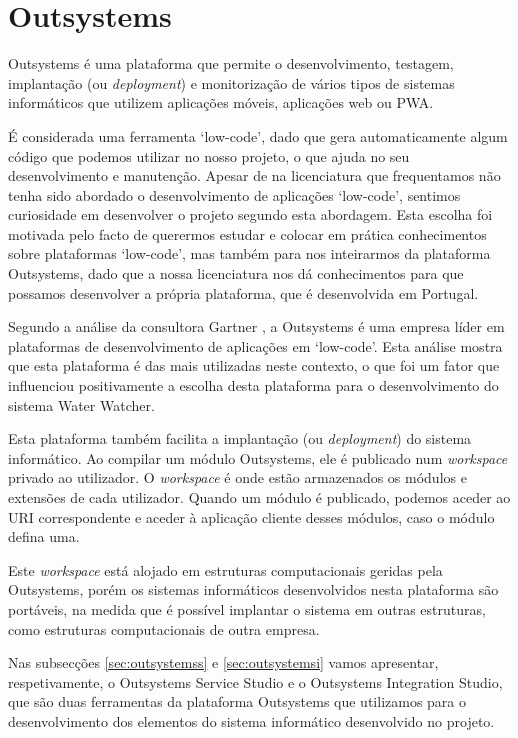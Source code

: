 \section{Outsystems} \label{sec:outsystems}
Outsystems é uma plataforma que permite o desenvolvimento, testagem, implantação (ou \textit{deployment}) e monitorização de vários tipos de sistemas informáticos que utilizem aplicações móveis, aplicações web ou PWA.\par
É considerada uma ferramenta ‘low-code’, dado que gera automaticamente algum código que podemos utilizar no nosso projeto, o que ajuda no seu desenvolvimento e manutenção. Apesar de na licenciatura que frequentamos não tenha sido abordado o desenvolvimento de aplicações ‘low-code’, sentimos curiosidade em desenvolver o projeto segundo esta abordagem. Esta escolha foi motivada pelo facto de querermos estudar e colocar em prática conhecimentos sobre plataformas ‘low-code’, mas também para nos inteirarmos da plataforma Outsystems, dado que a nossa licenciatura nos dá conhecimentos para que possamos desenvolver a própria plataforma, que é desenvolvida em Portugal. \par
Segundo a análise da consultora Gartner \cite{gartner}, a Outsystems é uma empresa líder em plataformas de desenvolvimento de aplicações em ‘low-code’. Esta análise mostra que esta plataforma é das mais utilizadas neste contexto, o que foi um fator que influenciou positivamente a escolha desta plataforma para o desenvolvimento do sistema Water Watcher.\par
Esta plataforma também facilita a implantação (ou \textit{deployment}) do sistema informático. Ao compilar um módulo Outsystems, ele é publicado num \textit{workspace} privado ao utilizador. O \textit{workspace} é onde estão armazenados os módulos e extensões de cada utilizador. Quando um módulo é publicado, podemos aceder ao URI correspondente e aceder à aplicação cliente desses módulos, caso o módulo defina uma.\par
Este \textit{workspace} está alojado em estruturas computacionais geridas pela Outsystems, porém os sistemas informáticos desenvolvidos nesta plataforma são portáveis, na medida que é possível implantar o sistema em outras estruturas, como estruturas computacionais de outra empresa.\par
Nas subsecções \ref{sec:outsystemss} e \ref{sec:outsystemsi} vamos apresentar, respetivamente, o Outsystems Service Studio e o Outsystems Integration Studio, que são duas ferramentas da plataforma Outsystems que utilizamos para o desenvolvimento dos elementos do sistema informático desenvolvido no projeto.

